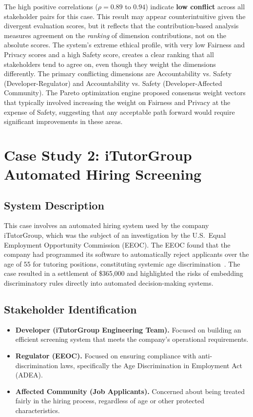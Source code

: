 The high positive correlations ($\rho = 0.89$ to $0.94$) indicate \textbf{low conflict} across all stakeholder pairs for this case. This result may appear counterintuitive given the divergent evaluation scores, but it reflects that the contribution-based analysis measures agreement on the \emph{ranking} of dimension contributions, not on the absolute scores. The system's extreme ethical profile, with very low Fairness and Privacy scores and a high Safety score, creates a clear ranking that all stakeholders tend to agree on, even though they weight the dimensions differently. The primary conflicting dimensions are Accountability vs. Safety (Developer-Regulator) and Accountability vs. Safety (Developer-Affected Community). The Pareto optimization engine proposed consensus weight vectors that typically involved increasing the weight on Fairness and Privacy at the expense of Safety, suggesting that any acceptable path forward would require significant improvements in these areas.

\section{Case Study 2: iTutorGroup Automated Hiring Screening}
\label{sec:cs2}

\subsection{System Description}

This case involves an automated hiring system used by the company iTutorGroup, which was the subject of an investigation by the U.S.\ Equal Employment Opportunity Commission (EEOC). The EEOC found that the company had programmed its software to automatically reject applicants over the age of 55 for tutoring positions, constituting systemic age discrimination~\cite{eeoc2022itutorgroup}. The case resulted in a settlement of \$365,000 and highlighted the risks of embedding discriminatory rules directly into automated decision-making systems.

\subsection{Stakeholder Identification}

\begin{itemize}[leftmargin=2em]
  \item \textbf{Developer (iTutorGroup Engineering Team).} Focused on building an efficient screening system that meets the company's operational requirements.
  \item \textbf{Regulator (EEOC).} Focused on ensuring compliance with anti-discrimination laws, specifically the Age Discrimination in Employment Act (ADEA).
  \item \textbf{Affected Community (Job Applicants).} Concerned about being treated fairly in the hiring process, regardless of age or other protected characteristics.
\end{itemize}

